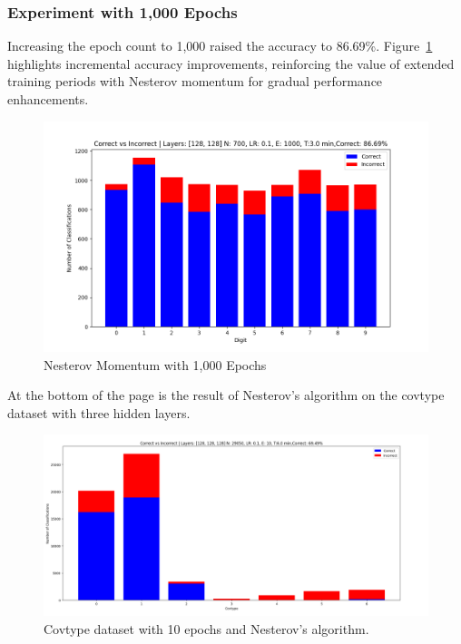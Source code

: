 \documentclass{article}
\begin{document}
\subsubsection{Experiment with 1,000 Epochs}
Increasing the epoch count to 1,000 raised the accuracy to 86.69\%. Figure~\ref{fig:Nes_1000ep} highlights incremental accuracy improvements, reinforcing the value of extended training periods with Nesterov momentum for gradual performance enhancements.

\begin{figure}[h!]
    \centering
    \includegraphics[scale=0.5]{../figs/Nes_1000ep.png}
    \caption{Nesterov Momentum with 1,000 Epochs}
    \label{fig:Nes_1000ep}
\end{figure}

At the bottom of the page is the result of Nesterov's algorithm on the covtype dataset with three hidden layers.

\begin{figure}
    \centering
    \includegraphics[scale=0.2]{3.png}
    \caption{Covtype dataset with 10 epochs and Nesterov's algorithm.}
    \label{fig:enter-label}
\end{figure}
\end{document}
